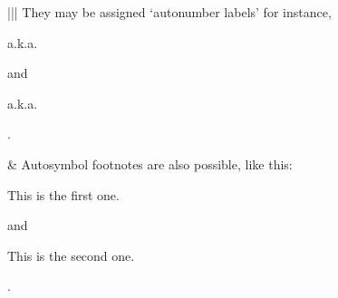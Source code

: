 \documentclass[letterpaper,10pt,english]{sphinxmanual}
\begin{document}
\begin{savenotes}
\begin{tabular}[t]{|*{2}{|}}
They may be assigned ‘autonumber
labels’ \sphinxhyphen{} for instance,
%
\begin{footnote}[16]\sphinxAtStartFootnote
a.k.a. {\hyperref[\detokenize{rst-cheatsheet/rst-cheatsheet:fourth}]{}}
%
\end{footnote} and %
\begin{footnote}[15]\sphinxAtStartFootnote
a.k.a. {\hyperref[\detokenize{rst-cheatsheet/rst-cheatsheet:third}]{}}
%
\end{footnote}.
\\
\hline
\begin{sphinxVerbatimintable}[commandchars=\\\{\}]
   
   \PYG{p}{[}\PYG{p}{]}  \PYG{p}{[}\PYG{p}{]}

 \PYG{p}{[}\PYG{p}{]}     
 \PYG{p}{[}\PYG{p}{]}     
\end{sphinxVerbatimintable}
&
Auto\sphinxhyphen{}symbol footnotes are also
possible, like this: %
\begin{footnote}[17]\sphinxAtStartFootnote
This is the first one.
%
\end{footnote} and %
\begin{footnote}[18]\sphinxAtStartFootnote
This is the second one.
%
\end{footnote}.
\\
\hline
\begin{sphinxVerbatimintable}[commandchars=\\\{\}]
   \PYG{p}{[}\PYG{p}{]}
    
     
 

 \PYG{p}{[}\PYG{p}{]}  
       


\end{sphinxVerbatimintable}
\end{tabular}
\end{savenotes}
\end{document}
